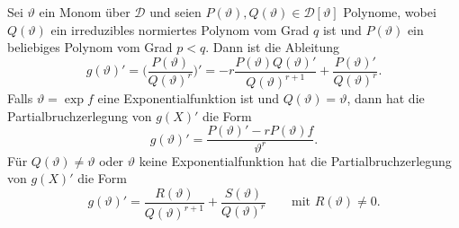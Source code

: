 \begin{satz}
\label{buch:integrale:satz:partialbruch-monom}
Sei $\vartheta$ ein Monom über $\mathscr{D}$ und
seien $P(\vartheta),Q(\vartheta)\in\mathscr{D}[\vartheta]$ Polynome,
wobei $Q(\vartheta)$ ein irreduzibles normiertes Polynom vom Grad $q$
ist und $P(\vartheta)$ ein beliebiges Polynom vom Grad $p<q$.
Dann ist die Ableitung
\begin{equation}
g(\vartheta)'
=
\biggl(
\frac{P(\vartheta)}{Q(\vartheta)^r}
\biggr)'
=
-r\frac{P(\vartheta)Q(\vartheta)'}{Q(\vartheta)^{r+1}}
+
\frac{P(\vartheta)'}{Q(\vartheta)^r}.
\label{buch:integrale:eqn:partialbruch-ableitung}
\end{equation}
Falls $\vartheta=\exp f$ eine Exponentialfunktion ist und
$Q(\vartheta)=\vartheta$, dann hat die Partialbruchzerlegung von $g(X)'$
die Form
\begin{equation}
g(\vartheta)'
=
\frac{
{P(\vartheta)'-rP(\vartheta)f}
}{
\vartheta^{r}
}.
\label{buch:integrale:eqn:partialbruch-ableitung-fall0}
\end{equation}
Für $Q(\vartheta)\ne \vartheta$ oder $\vartheta$ keine Exponentialfunktion
hat die Partialbruchzerlegung von $g(X)'$ die Form
\[
g(\vartheta)'
=
\frac{R(\vartheta)}{Q(\vartheta)^{r+1}}+\frac{S(\vartheta)}{Q(\vartheta)^r}
\qquad\text{mit $R(\vartheta)\ne 0$}.
\]
\end{satz}

